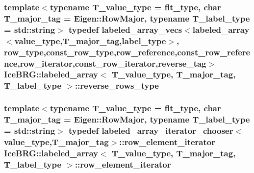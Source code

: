 \subsubsection[{reverse\+\_\+rows\+\_\+type}]{\setlength{\rightskip}{0pt plus 5cm}template$<$typename T\+\_\+value\+\_\+type = flt\+\_\+type, char T\+\_\+major\+\_\+tag = Eigen\+::\+Row\+Major, typename T\+\_\+label\+\_\+type = std\+::string$>$ typedef {\bf labeled\+\_\+array\+\_\+vecs}$<${\bf labeled\+\_\+array}$<${\bf value\+\_\+type},T\+\_\+major\+\_\+tag,{\bf label\+\_\+type}$>$, {\bf row\+\_\+type},{\bf const\+\_\+row\+\_\+type},{\bf row\+\_\+reference},{\bf const\+\_\+row\+\_\+reference},{\bf row\+\_\+iterator},{\bf const\+\_\+row\+\_\+iterator},{\bf reverse\+\_\+tag}$>$ {\bf Ice\+B\+R\+G\+::labeled\+\_\+array}$<$ T\+\_\+value\+\_\+type, T\+\_\+major\+\_\+tag, T\+\_\+label\+\_\+type $>$\+::{\bf reverse\+\_\+rows\+\_\+type}}\label{classIceBRG_1_1labeled__array_a24ccb02827e9be94dadbcf647c663b03}
\hypertarget{classIceBRG_1_1labeled__array_a9b24e3ef822b100eeffa9aedea0a362a}{}
\subsubsection[{row\+\_\+element\+\_\+iterator}]{\setlength{\rightskip}{0pt plus 5cm}template$<$typename T\+\_\+value\+\_\+type = flt\+\_\+type, char T\+\_\+major\+\_\+tag = Eigen\+::\+Row\+Major, typename T\+\_\+label\+\_\+type = std\+::string$>$ typedef {\bf labeled\+\_\+array\+\_\+iterator\+\_\+chooser}$<${\bf value\+\_\+type},T\+\_\+major\+\_\+tag$>$\+::{\bf row\+\_\+element\+\_\+iterator} {\bf Ice\+B\+R\+G\+::labeled\+\_\+array}$<$ T\+\_\+value\+\_\+type, T\+\_\+major\+\_\+tag, T\+\_\+label\+\_\+type $>$\+::{\bf row\+\_\+element\+\_\+iterator}}\label{classIceBRG_1_1labeled__array_a9b24e3ef822b100eeffa9aedea0a362a}
\hypertarget{classIceBRG_1_1labeled__array_a53f977307768e8a9f19dae19ebfbea8c}{}
